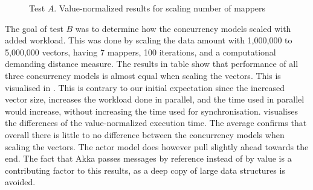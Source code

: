 \begin{figure}[h]
\centering
\dataset
{}
\caption{Test $A$. Value-normalized results for scaling number of mappers}\label{fig:value_norm_testa}
\end{figure}
%
The goal of test $B$ was to determine how the concurrency models scaled with added workload. This was done by scaling the data amount with 1,000,000 to 5,000,000 vectors, having 7 mappers, 100 iterations, and a computational demanding distance measure. The results in table  show that performance of all three concurrency models is almost equal when scaling the vectors. This is visualised in . This is contrary to our initial expectation since the increased vector size, increases the workload done in parallel, and the time used in parallel would increase, without increasing the time used for synchronisation.  visualises the differences of the value-normalized execution time. The average confirms that overall there is little to no difference between the concurrency models when scaling the vectors. The actor model does however pull slightly ahead towards the end. The fact that Akka passes messages by reference instead of by value is a contributing factor to this results, as a deep copy of large data structures is avoided. 

